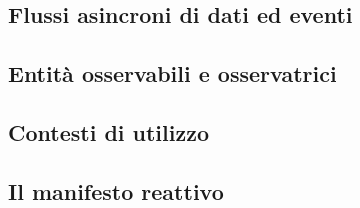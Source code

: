 \documentclass[12pt,a4paper,openright,twoside]{book}
\begin{document}
\subsection{Flussi asincroni di dati ed eventi}

\subsection{Entità osservabili e osservatrici}

\subsection{Contesti di utilizzo}

\subsection{Il manifesto reattivo}

\backmatter




\end{document}
